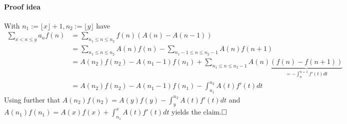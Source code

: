 \paragraph{Proof idea} With $n_1 := \lfloor x \rfloor + 1, n_2 := \lfloor y \rfloor$ have
\begin{align*}
    \sum_{x < n \leq y} a_n f(n) &= \sum_{n_1 \leq n \leq n_2} f(n)(A(n) - A(n - 1)) \\
    &= \sum_{n_1 \leq n \leq n_2} A(n) f(n) - \sum_{n_1 - 1 \leq n \leq n_2 - 1} A(n) f(n + 1) \\
    &= A(n_2) f(n_2) - A(n_1 - 1) f(n_1) + \sum_{n_1 \leq n \leq n_2 - 1} A(n) \underbrace{(f(n) - f(n + 1))}_{= -\int_n^{n+1} f'(t) dt} \\
    &= A(n_2) f(n_2) - A(n_1 - 1) f(n_1) - \int_{n_1}^{n_2} A(t) f'(t) dt
\end{align*}
Using further that $A(n_2) f(n_2) = A(y) f(y) - \int_y^{n_2} A(t) f'(t) dt$ and $A(n_1) f(n_1) = A(x) f(x) + \int_{n_1}^x A(t) f'(t) dt$ yields the claim.$\hfill\square$

